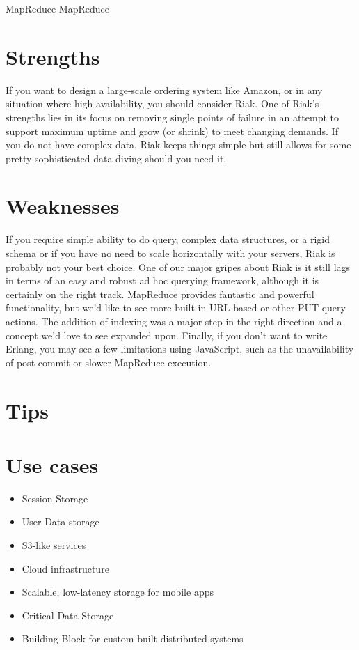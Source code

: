 MapReduce MapReduce

\section{Strengths}

If you want to design a large-scale ordering system like Amazon, or in any situation where high availability, you should consider Riak. One of Riak's strengths lies in its focus on removing single points of failure in an attempt to support maximum uptime and grow (or shrink) to meet changing demands. If you do not have complex data, Riak keeps things simple but still allows for some pretty sophisticated data diving should you need it.\cite{seven_databases}

\section{Weaknesses}

If you require simple ability to do query, complex data structures, or a rigid schema or if you have no need to scale horizontally with your servers, Riak is probably not your best choice. One of our major gripes about Riak is it still lags in terms of an easy and robust ad hoc querying framework, although it is certainly on the right track. MapReduce provides fantastic and powerful functionality, but we’d like to see more built-in URL-based or other PUT query actions. The addition of indexing was a major step in the right direction and a concept we’d love to see expanded upon. Finally, if you don’t want to write Erlang, you may see a few limitations using JavaScript, such as the unavailability of post-commit or slower MapReduce execution.\cite{seven_databases}

\section{Tips}

\section{Use cases}

\begin{itemize}
  \item Session Storage
  \item User Data storage
  \item S3-like services
  \item Cloud infrastructure
  \item Scalable, low-latency storage for mobile apps
  \item Critical Data Storage
  \item Building Block for custom-built distributed systems
\end{itemize}